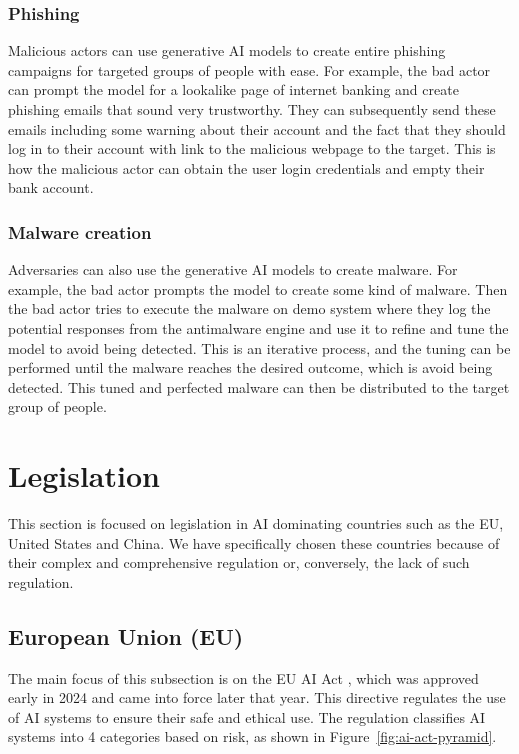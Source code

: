 \subsubsection*{Phishing}

Malicious actors can use generative AI models to create entire phishing campaigns for targeted groups of people with ease. For example, the bad actor can prompt the model for a lookalike page of internet banking and create phishing emails that sound very trustworthy. They can subsequently send these emails including some warning about their account and the fact that they should log in to their account with link to the malicious webpage to the target. This is how the malicious actor can obtain the user login credentials and empty their bank account.

\subsubsection*{Malware creation}

Adversaries can also use the generative AI models to create malware. For example, the bad actor prompts the model to create some kind of malware. Then the bad actor tries to execute the malware on demo system where they log the potential responses from the antimalware engine and use it to refine and tune the model to avoid being detected. This is an iterative process, and the tuning can be performed until the malware reaches the desired outcome, which is avoid being detected. This tuned and perfected malware can then be distributed to the target group of people.

\section{Legislation} \label{sec:legislation}

This section is focused on legislation in AI dominating countries such as the EU, United States and China. We have specifically chosen these countries because of their complex and comprehensive regulation or, conversely, the lack of such regulation.

\subsection{European Union (EU)}
The main focus of this subsection is on the EU AI Act \cite{eu_ai_act_2024}, which was approved early in 2024 and came into force later that year. This directive regulates the use of AI systems to ensure their safe and ethical use. The regulation classifies AI systems into 4 categories based on risk, as shown in Figure~\ref{fig:ai-act-pyramid}.

